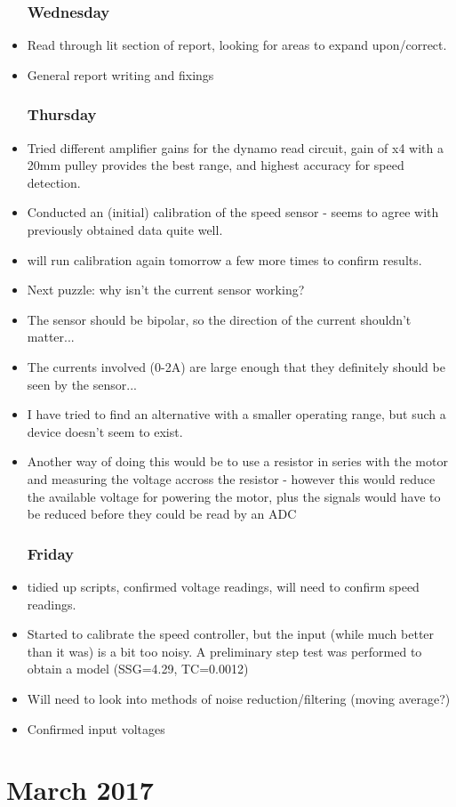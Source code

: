 \documentclass[a4]{report}
\def\thu{\subsection*{Thursday}}
\def\fri{\subsection*{Friday}}
\begin{document}
\begin{itemize}
		\subsection*{Wednesday}
		\item Read through lit section of report, looking for areas to expand upon/correct.
		\item General report writing and fixings
		\thu
		\item Tried different amplifier gains for the dynamo read circuit, gain of x4 with a 20mm pulley provides the best range, and highest accuracy for speed detection.
		\item Conducted an (initial) calibration of the speed sensor - seems to agree with previously obtained data quite well.
		\item will run calibration again tomorrow a few more times to confirm results.
		\item Next puzzle: why isn't the current sensor working?
		\item The sensor should be bipolar, so the direction of the current shouldn't matter...
		\item The currents involved (0-2A) are large enough that they definitely should be seen by the sensor...
		\item I have tried to find an alternative with a smaller operating range, but such a device doesn't seem to exist.
		\item Another way of doing this would be to use a resistor in series with the motor and measuring the voltage accross the resistor - however this would reduce the available voltage for powering the motor, plus the signals would have to be reduced before they could be read by an ADC
		\fri
		\item tidied up scripts, confirmed voltage readings, will need to confirm speed readings.
		\item Started to calibrate the speed controller, but the input (while much better than it was) is a bit too noisy. A preliminary step test was performed to obtain a model (SSG=4.29, TC=0.0012)
		\item Will need to look into methods of noise reduction/filtering (moving average?)
		\item Confirmed input voltages
	\end{itemize}
	\newpage
	\chapter{March 2017}
\end{document}
